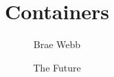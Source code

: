\documentclass{csse4400}
\title{Containers}
\author{Brae Webb}
\date{{\color{red} The Future}}
\begin{document}
\makecover






\end{document}
